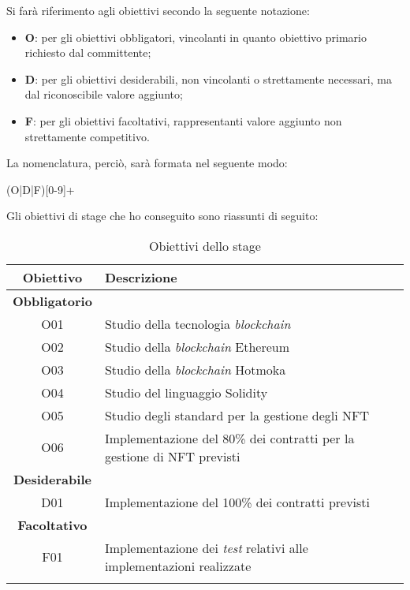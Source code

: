 \noindent Si farà riferimento agli obiettivi secondo la seguente notazione:
\begin{itemize}
  \item \textbf{O}: per gli obiettivi obbligatori, vincolanti in quanto obiettivo primario richiesto dal committente;
  \item \textbf{D}: per gli obiettivi desiderabili, non vincolanti o strettamente necessari, ma dal riconoscibile valore aggiunto;
  \item \textbf{F}: per gli obiettivi facoltativi, rappresentanti valore aggiunto non strettamente competitivo.
\end{itemize}

\noindent La nomenclatura, perciò, sarà formata nel seguente modo:
\begin{center}
  (O|D|F)[0-9]+
\end{center}

\noindent Gli obiettivi di stage che ho conseguito sono riassunti di seguito:
\begin{longtabu}{|c|X|}
  \hline

  \textbf{Obiettivo} & \textbf{Descrizione} \\ \hline

  \textbf{Obbligatorio} & \\

  O01       & Studio della tecnologia \textit{blockchain} \\
  O02       & Studio della \textit{blockchain} Ethereum \\
  O03       & Studio della \textit{blockchain} Hotmoka \\ 
  O04       & Studio del linguaggio Solidity \\ 
  O05       & Studio degli standard per la gestione degli NFT \\ 
  O06       & Implementazione del 80\% dei contratti per la gestione di NFT previsti \\
  
  \hline

  \textbf{Desiderabile} &  \\
  
  D01       & Implementazione del 100\% dei contratti previsti \\

  \hline

  \textbf{Facoltativo} & \\

  F01       & Implementazione dei \textit{test} relativi alle implementazioni realizzate \\

  \hline

  \caption{Obiettivi dello stage}
\end{longtabu}

